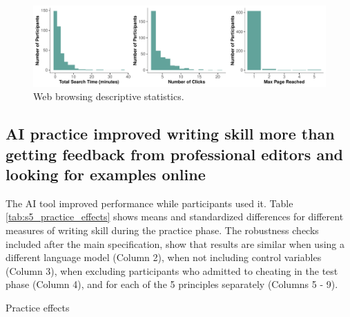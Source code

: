 \documentclass[11pt]{report}
\begin{document}
\begin{append}
\begin{figure}
    \centering
    \includegraphics[width=\linewidth]{search.pdf}
    \caption{Web browsing descriptive statistics.}
    \label{fig:placeholder}
\end{figure}

\subsection{AI practice improved writing skill more than getting feedback from professional editors and looking for examples online}

The AI tool improved performance while participants used it. Table \ref{tab:s5_practice_effects} shows means and standardized differences for different measures of writing skill during the practice phase. The robustness checks included after the main specification, show that results are similar when using a different language model (Column 2), when not including control variables (Column 3), when excluding participants who admitted to cheating in the test phase (Column 4), and for each of the 5 principles separately (Columns 5 - 9).

\begin{table}
\centering
\caption{Practice effects}


\end{table}
\end{append}
\end{document}
